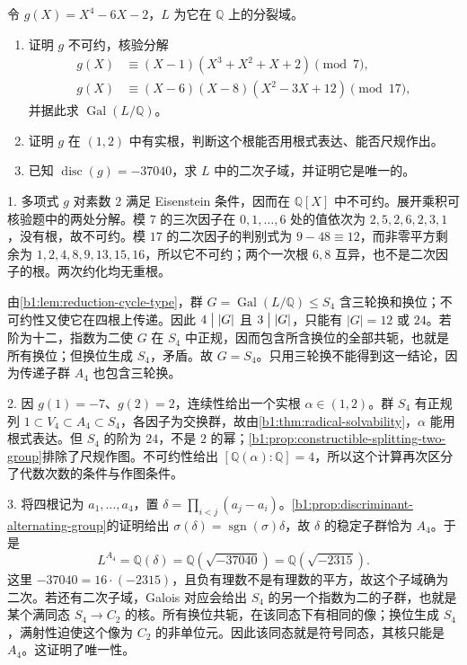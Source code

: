 \begin{exercise}\label{b1:ex:21-reduction-quartic}
	令 \(g(X)=X^4-6X-2\)，\(L\) 为它在 \(\mathbb Q\) 上的分裂域。
	\begin{enumerate}
		\item 证明 \(g\) 不可约，核验分解
			\[
				\begin{aligned}
					g(X)&\equiv(X-1)(X^3+X^2+X+2)\pmod7,\\
					g(X)&\equiv(X-6)(X-8)(X^2-3X+12)\pmod{17},
				\end{aligned}
			\]
			并据此求 \(\operatorname{Gal}(L/\mathbb Q)\)。
		\item 证明 \(g\) 在 \((1,2)\) 中有实根，判断这个根能否用根式表达、能否尺规作出。
		\item 已知 \(\operatorname{disc}(g)=-37040\)，求 \(L\) 中的二次子域，并证明它是唯一的。
	\end{enumerate}
\end{exercise}
\begin{solution}
	1. 多项式 \(g\) 对素数 \(2\) 满足 Eisenstein 条件，因而在 \(\mathbb Q[X]\) 中不可约。展开乘积可核验题中的两处分解。模 \(7\) 的三次因子在 \(0,1,\ldots,6\) 处的值依次为 \(2,5,2,6,2,3,1\)，没有根，故不可约。模 \(17\) 的二次因子的判别式为 \(9-48\equiv12\)，而非零平方剩余为 \(1,2,4,8,9,13,15,16\)，所以它不可约；两个一次根 \(6,8\) 互异，也不是二次因子的根。两次约化均无重根。

	由\cref{b1:lem:reduction-cycle-type}，群 \(G=\operatorname{Gal}(L/\mathbb Q)\leq S_4\) 含三轮换和换位；不可约性又使它在四根上传递。因此 \(4\bigm\vert|G|\) 且 \(3\bigm\vert|G|\)，只能有 \(|G|=12\) 或 \(24\)。若阶为十二，指数为二使 \(G\) 在 \(S_4\) 中正规，因而包含所含换位的全部共轭，也就是所有换位；但换位生成 \(S_4\)，矛盾。故 \(G=S_4\)。只用三轮换不能得到这一结论，因为传递子群 \(A_4\) 也包含三轮换。

	2. 因 \(g(1)=-7\)、\(g(2)=2\)，连续性给出一个实根 \(\alpha\in(1,2)\)。群 \(S_4\) 有正规列 \(1\subset V_4\subset A_4\subset S_4\)，各因子为交换群，故由\cref{b1:thm:radical-solvability}，\(\alpha\) 能用根式表达。但 \(S_4\) 的阶为 \(24\)，不是 \(2\) 的幂；\cref{b1:prop:constructible-splitting-two-group}排除了尺规作图。不可约性给出 \([\mathbb Q(\alpha):\mathbb Q]=4\)，所以这个计算再次区分了代数次数的条件与作图条件。

	3. 将四根记为 \(a_1,\ldots,a_4\)，置 \(\delta=\prod_{i<j}(a_j-a_i)\)。\cref{b1:prop:discriminant-alternating-group}的证明给出 \(\sigma(\delta)=\operatorname{sgn}(\sigma)\delta\)，故 \(\delta\) 的稳定子群恰为 \(A_4\)。于是
	\[
		L^{A_4}=\mathbb Q(\delta) =\mathbb Q(\sqrt{-37040}) =\mathbb Q(\sqrt{-2315}).
	\]
	这里 \(-37040=16\cdot(-2315)\)，且负有理数不是有理数的平方，故这个子域确为二次。若还有二次子域，Galois 对应会给出 \(S_4\) 的另一个指数为二的子群，也就是某个满同态 \(S_4\longrightarrow C_2\) 的核。所有换位共轭，在该同态下有相同的像；换位生成 \(S_4\)，满射性迫使这个像为 \(C_2\) 的非单位元。因此该同态就是符号同态，其核只能是 \(A_4\)。这证明了唯一性。
\end{solution}
